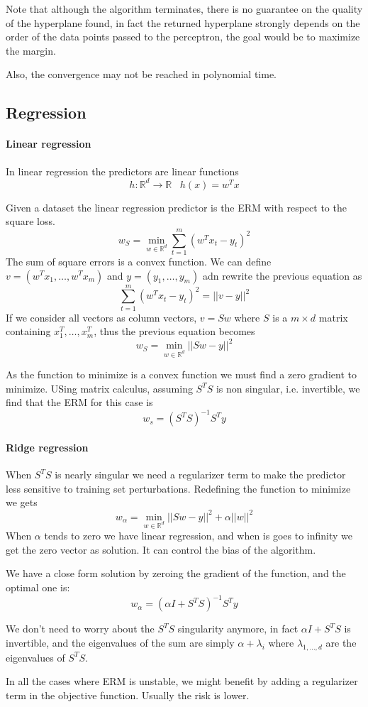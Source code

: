 Note that although the algorithm terminates, there is no guarantee on 
the quality of the hyperplane found, in fact the returned hyperplane
strongly depends on the order of the data points passed to the perceptron, 
the goal would be to maximize the margin.

Also, the convergence may not be reached in polynomial time.

\subsection{Regression}

\paragraph{Linear regression}
In linear regression the predictors are linear functions
$$h : \mathbb{R}^d \rightarrow \mathbb{R}\;\;\; h(x) = w^Tx$$

Given a dataset the linear regression predictor is the ERM 
with respect to the square loss.
$$w_S = \min_{w \in \mathbb{R}^d} \sum_{t=1}^m (w^Tx_t - y_t)^2$$
The sum of square errors is a convex function. We can 
define $v = (w^Tx_1,\dots, w^Tx_m)$ and $y = (y_1, \dots, y_m)$ adn 
rewrite the previous equation as 
$$\sum_{t=1}^m (w^Tx_t - y_t)^2 = ||v - y||^2$$
If we consider all vectors as column vectors, $v = Sw$ where $S$ is a 
$m\times d$ matrix containing $x_1^T, \dots, x_m^T$, 
thus the previous equation becomes 
$$w_S = \min_{w \in \mathbb{R}^d} ||Sw - y||^2$$

As the function to minimize is a convex function we must find a zero 
gradient to minimize.
USing matrix calculus, assuming $S^TS$ is non singular, i.e. invertible, we find that the ERM for this case is 
$$w_s = (S^TS)^{-1}S^Ty$$

\paragraph{Ridge regression}
When $S^TS$ is nearly singular we need a regularizer term to make 
the predictor less sensitive to training set perturbations.
Redefining the function to minimize we gets
$$w_\alpha = \min_{w \in \mathbb{R}^d} ||Sw - y||^2 + \alpha||w||^2$$
When $\alpha$ tends to zero we have linear regression, and when is goes to 
infinity we get the zero vector as solution. It can control the bias of the 
algorithm.

We have a close form solution by zeroing the gradient of the function, 
and the optimal one is:
$$w_\alpha = (\alpha I + S^TS)^{-1}S^Ty$$

We don't need to worry about the $S^TS$ singularity anymore, in fact 
$\alpha I + S^TS$ is invertible, and the eigenvalues of the sum are simply 
$\alpha + \lambda_i$ where $\lambda_{1, \dots, d}$ are the eigenvalues of $S^TS$.

\begin{remark}
    In all the cases where ERM is unstable, we might benefit by adding a 
    regularizer term in the objective function. Usually the risk 
    is lower.
\end{remark}